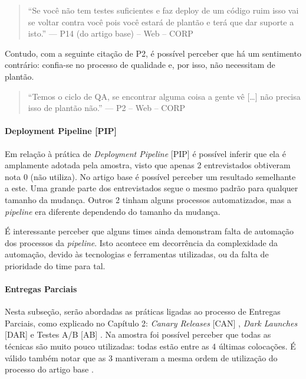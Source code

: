 \begin{quote}
    ``Se você não tem testes suficientes e faz deploy de um código ruim isso vai se voltar contra você pois você estará de plantão e terá que dar suporte a isto.'' --- P14 (do artigo base) -- Web -- CORP
\end{quote}


Contudo, com a seguinte citação de P2, é possível perceber que há um sentimento contrário: confia-se no processo de qualidade e, por isso, não necessitam de plantão.


\begin{quote}
    ``Temos o ciclo de QA, se encontrar alguma coisa a gente vê […] não precisa isso de plantão não.'' --- P2 -- Web -- CORP
\end{quote}

\paragraph{Deployment Pipeline [PIP]}

Em relação à prática de \emph{Deployment Pipeline} [PIP] é possível inferir que ela é amplamente adotada pela amostra, visto que apenas 2 entrevistados obtiveram nota 0 (não utiliza). No artigo base é possível perceber um resultado semelhante a este. Uma grande parte dos entrevistados segue o mesmo padrão para qualquer tamanho da mudança. Outros 2 tinham alguns processos automatizados, mas a \emph{pipeline} era diferente dependendo do tamanho da mudança.

É interessante perceber que alguns times ainda demonstram falta de automação dos processos da \emph{pipeline}. Isto acontece em decorrência da complexidade da automação, devido às tecnologias e ferramentas utilizadas, ou da falta de prioridade do time para tal.
 
\paragraph{Entregas Parciais}

Nesta subseção, serão abordadas as práticas ligadas ao processo de Entregas Parciais, como explicado no Capítulo 2: \emph{Canary Releases} [CAN] \cite{continuousDeliveryBook}, \emph{Dark Launches} [DAR] \cite{devAndDeploymentFB} e Testes A/B [AB] \cite{testsAB}. Na amostra foi possível perceber que todas as técnicas são muito pouco utilizadas: todas estão entre as 4 últimas colocações. É válido também notar que as 3 mantiveram a mesma ordem de utilização do processo do artigo base \cite{empiricalStudy2016}.

